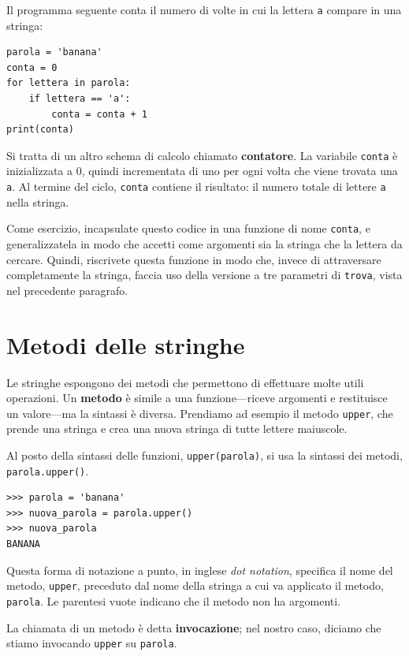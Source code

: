 \documentclass[10pt]{book}
\begin{document}
Il programma seguente conta il numero di volte in cui la lettera {\tt a}
compare in una stringa:

\begin{verbatim}
parola = 'banana'
conta = 0
for lettera in parola:
    if lettera == 'a':
        conta = conta + 1
print(conta)
\end{verbatim}
%
Si tratta di un altro schema di calcolo chiamato {\bf contatore}.  La variabile {\tt conta} è inizializzata a 0, quindi incrementata di uno per ogni volta che viene trovata una {\tt a}.
Al termine del ciclo, {\tt conta} contiene il risultato: il numero totale di lettere {\tt a} nella stringa.

Come esercizio, incapsulate questo codice in una funzione di nome {\tt conta}, e generalizzatela in modo che accetti come argomenti sia la stringa che la lettera da cercare.
Quindi, riscrivete questa funzione in modo che, invece di attraversare completamente la stringa, faccia uso della versione a tre parametri di {\tt trova}, vista nel precedente paragrafo.

\section{Metodi delle stringhe}
\label{optional}

Le stringhe espongono dei metodi che permettono di effettuare molte utili operazioni. Un {\bf metodo} è simile a una funzione---riceve argomenti e restituisce un valore---ma la sintassi è diversa. Prendiamo ad esempio il metodo {\tt upper}, che prende una stringa e crea una nuova stringa di tutte lettere maiuscole.

Al posto della sintassi delle funzioni, {\tt upper(parola)}, si usa la sintassi dei metodi, {\tt parola.upper()}.

\begin{verbatim}
>>> parola = 'banana'
>>> nuova_parola = parola.upper()
>>> nuova_parola
BANANA
\end{verbatim}
%
Questa forma di notazione a punto, in inglese {\em dot notation}, specifica il nome del metodo, {\tt upper}, preceduto dal nome della stringa a cui va applicato il metodo, {\tt parola}. Le parentesi vuote indicano che il metodo non ha argomenti.

La chiamata di un metodo è detta {\bf invocazione}; nel nostro caso, diciamo che stiamo invocando {\tt upper} su {\tt parola}.
\end{document}
